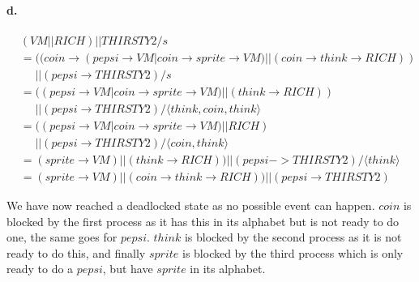 \documentclass[a4paper, 11pt]{article}
\begin{document}

\paragraph{d.} %
\label{par:dd_}

\begin{align*}
&(VM || RICH) || THIRSTY2 / s \\
&= 
((coin \rightarrow (pepsi \rightarrow VM | coin \rightarrow sprite \rightarrow VM) || (coin \rightarrow think \rightarrow RICH)) \\
&\phantom{=} || (pepsi \rightarrow THIRSTY2) / s \\
&= ((pepsi \rightarrow VM | coin \rightarrow sprite \rightarrow VM) || (think \rightarrow RICH)) \\
&\phantom{=} || (pepsi \rightarrow THIRSTY2) / \langle think, coin, think \rangle \\
&= ((pepsi \rightarrow VM | coin \rightarrow sprite \rightarrow VM) || RICH) \\
&\phantom{=} || (pepsi \rightarrow THIRSTY2) / \langle coin, think \rangle \\
&= (sprite \rightarrow VM) || (think \rightarrow RICH)) || (pepsi -> THIRSTY2) / \langle think \rangle \\
&= (sprite \rightarrow VM) || (coin \rightarrow think \rightarrow RICH)) || (pepsi \rightarrow THIRSTY2)
\end{align*}

We have now reached a deadlocked state as no possible event can happen. $coin$ is blocked by the first process as it has this in its alphabet but is not ready to do one, the same goes for $pepsi$. $think$ is blocked by the second process as it is not ready to do this, and finally $sprite$ is blocked by the third process which is only ready to do a $pepsi$, but have $sprite$ in its alphabet.


\end{document}
